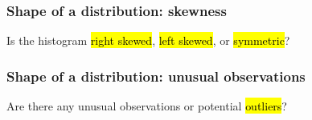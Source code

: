 \documentclass[slidestop,compress,mathserif]{beamer}
\newcommand{\soln}[1]{\textit{#1}}
\begin{document}

\begin{frame}
\frametitle{Shape of a distribution: skewness}

Is the histogram \hl{right skewed}, \hl{left skewed}, or \hl{symmetric}?

\begin{center}
\end{center}


\end{frame}


\begin{frame}
\frametitle{Shape of a distribution: unusual observations}

Are there any unusual observations or potential \hl{outliers}?

\begin{center}
\end{center}

\end{frame}







\end{document}

